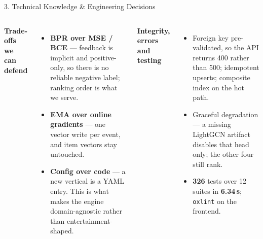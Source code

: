 \documentclass[aspectratio=169, 11pt]{beamer}
\newcommand{\eqs}{%
  \setlength{\abovedisplayskip}{3pt}%
  \setlength{\belowdisplayskip}{3pt}%
  \setlength{\abovedisplayshortskip}{2pt}%
  \setlength{\belowdisplayshortskip}{2pt}}
\newcommand{\blk}[1]{{\scriptsize\eqs\textbf{#1}}\par\vspace{0.9mm}}
\newenvironment{tight}{\begin{itemize}\scriptsize\setlength{\itemsep}{3.2pt}}{\end{itemize}}
\begin{document}
\begin{frame}[shrink]{3. Technical Knowledge \& Engineering Decisions}
\begin{columns}[T]
\blk{Trade-offs we can defend}
\begin{tight}
  \item \textbf{BPR over MSE / BCE} --- feedback is implicit and positive-only, so there is no
        reliable negative label; ranking order is what we serve.
  \item \textbf{EMA over online gradients} --- one vector write per event, and item vectors stay
        untouched.
  \item \textbf{Config over code} --- a new vertical is a YAML entry. This is what makes the
        engine domain-agnostic rather than entertainment-shaped.
\end{tight}
\vspace{2mm}
\blk{Integrity, errors and testing}
\begin{tight}
  \item Foreign key pre-validated, so the API returns 400 rather than 500; idempotent upserts;
        composite index on the hot path.
  \item Graceful degradation --- a missing LightGCN artifact disables that head only; the other
        four still rank.
  \item \textbf{326} tests over 12 suites in \textbf{6.34\,s}; \texttt{oxlint} on the frontend.
\end{tight}
\end{columns}
\end{frame}
\end{document}
